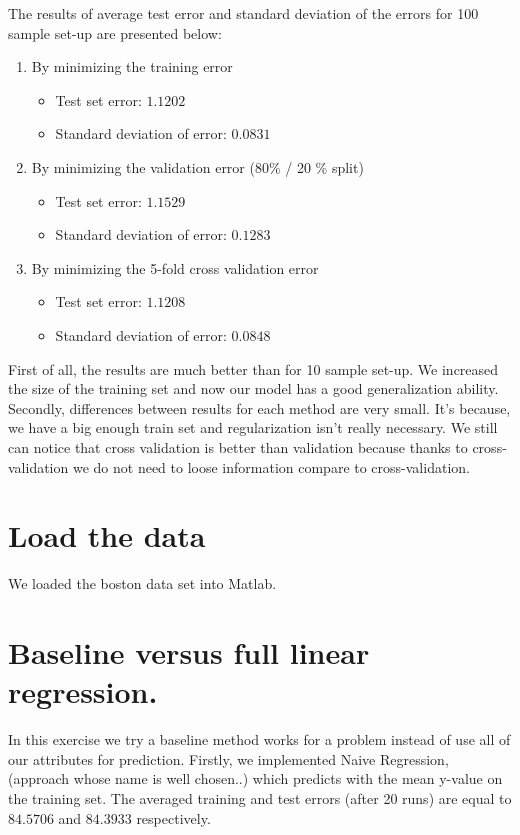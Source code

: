 \documentclass{article} %
\begin{document}
The results of average test error and standard deviation of the errors for 100 sample set-up are presented below:

\begin{enumerate}
\item By minimizing the training error
\begin{itemize}
\item Test set error: $1.1202$
\item Standard deviation of error: $0.0831$
\end{itemize}
\item By minimizing the validation error (80\% / 20 \% split)
\begin{itemize}
\item Test set error: $ 1.1529$
\item Standard deviation of error: $ 0.1283$
\end{itemize}
\item By minimizing the 5-fold cross validation error
\begin{itemize}
\item Test set error: $1.1208$
\item Standard deviation of error: $0.0848$
\end{itemize}
\end{enumerate}
First of all, the results are much better than for 10 sample set-up. We increased the size of the training set and now our model has a good generalization ability. Secondly,  differences between results for each method are very small. It's because, we have a big enough train set and regularization isn't really necessary. We still can notice that cross validation is better than validation because thanks to cross-validation we do not need to loose information compare to cross-validation. 

\section{Load the data}
We loaded the boston data set into Matlab.
\section{Baseline versus full linear regression.}
In this exercise we try a baseline method works for a problem instead of use all of our attributes for prediction. Firstly, we implemented Naive Regression, (approach whose name is well chosen..) which predicts with the mean y-value on the training set. The averaged training and test errors (after 20 runs) are equal to $ 84.5706$ and $84.3933$ respectively. 
\end{document}
